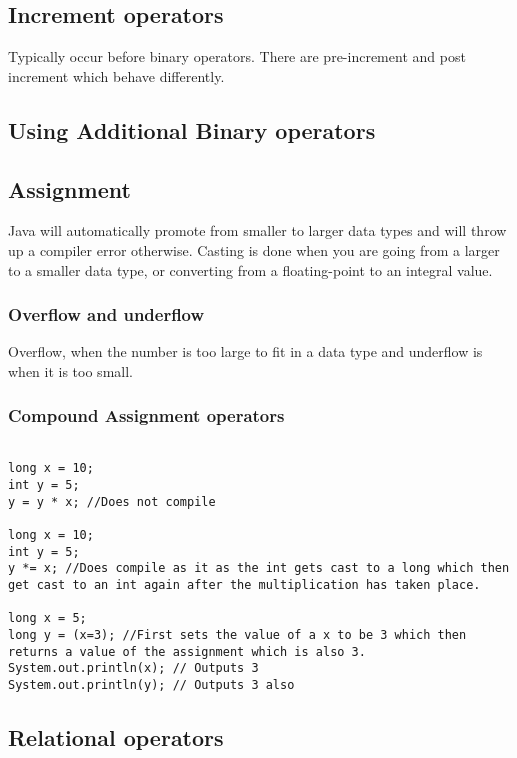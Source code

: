\documentclass[a4paper]{report}   %
\begin{document}
\subsection{Increment operators}
Typically occur before binary operators. There are pre-increment and post increment which behave differently.

\subsection{Using Additional Binary operators}

\subsection{Assignment}
Java will automatically promote from smaller to larger data types and will throw up a compiler error otherwise. Casting is done when you are going from a larger to a smaller data type, or converting from a floating-point to an integral value.

\subsubsection{Overflow and underflow}
Overflow, when the number is too large to fit in a data type and underflow is when it is too small.

\subsubsection{Compound Assignment operators}

\begin{lstlisting}

long x = 10;
int y = 5;
y = y * x; //Does not compile

long x = 10;
int y = 5;
y *= x; //Does compile as it as the int gets cast to a long which then get cast to an int again after the multiplication has taken place.

long x = 5;
long y = (x=3); //First sets the value of a x to be 3 which then returns a value of the assignment which is also 3.
System.out.println(x); // Outputs 3
System.out.println(y); // Outputs 3 also

\end{lstlisting}

\subsection{Relational operators}
\end{document}

